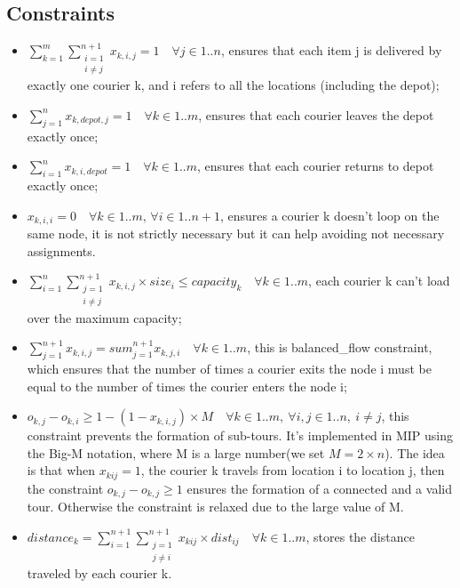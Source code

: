 \documentclass{article}
\begin{document}
\subsection{Constraints}
\begin{itemize}
    \item 
    $\sum_{k=1}^{m} \sum_{\substack{i=1 \\ i \ne j}}^{n+1} x_{k,i,j} = 1 \quad \forall j \in 1..n$, ensures that each item j is delivered by exactly one courier k, and i refers to all the locations (including the depot);
    \item
    $\sum_{j=1}^{n} x_{k,depot,j} = 1 \quad \forall k \in 1..m$, ensures that each courier leaves the depot exactly once;
    \item 
    $\sum_{i=1}^{n} x_{k,i,depot} = 1 \quad \forall k \in 1..m$, ensures that each courier returns to depot exactly once;
    \item 
    $x_{k,i,i} = 0 \quad \forall k \in 1..m, \, \forall i \in 1..n+1$, ensures a courier k doesn't loop on the same node, it is not strictly necessary but it can help avoiding not necessary assignments.
    \item 
    $\sum_{i=1}^{n} \sum_{\substack{j=1 \\ i \ne j}}^{n+1} x_{k,i,j}\times size_{i} \leq capacity_{k} \quad \forall k \in 1..m$, each courier k can't load over the maximum capacity;
    \item 
    $\sum_{j=1}^{n+1} x_{k,i,j} = sum_{j=1}^{n+1} x_{k,j,i} \quad \forall k \in 1..m$, this is balanced\_flow constraint, which ensures that the number of times a courier exits the node i must be equal to the number of times the courier enters the node i;
    \item 
    $o_{k,j} - o_{k,i} \geq 1 - (1 - x_{k,i,j}) \times M \quad \forall k \in 1..m,\ \forall i, j \in 1..n,\ i \ne j$, this constraint prevents the formation of sub-tours. It's implemented in MIP using the Big-M notation, where M is a large number(we set $M=2\times n$). The idea is that when $x_{kij}=1$, the courier k travels from location i to location j, then the constraint $o_{k,j} - o_{k,j} \geq 1$ ensures the formation of a connected and a valid tour. Otherwise the constraint is relaxed due to the large value of M. 
    \item 
    $distance_k = \sum_{i=1}^{n+1}\sum_{\substack{j=1 \\ j \ne i}}^{n+1}x_{kij}\times dist_{ij} \quad \forall k\in 1..m$, stores the distance traveled by each courier k.
\end{itemize}
\end{document}
